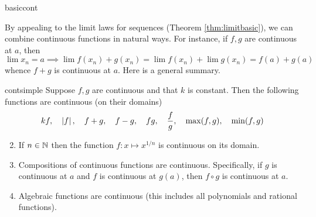 \begin{examples}{}{basiccont}
\begin{enumerate}
  
\end{enumerate}
\end{examples}


By appealing to the limit laws for sequences (Theorem \ref{thm:limitbasic}), we can combine continuous functions in natural ways. For instance, if $f,g$ are continuous at $a$, then
\[\lim x_n=a\implies \lim f(x_n)+g(x_n)=\lim f(x_n)+\lim g(x_n)=f(a)+g(a)\]
whence $f+g$ is continuous at $a$. Here is a general summary.

\begin{thm}{}{contsimple}
\exstart Suppose $f,g$ are continuous and that $k$ is constant. Then the following functions are continuous (on their domains)
	\[kf,\quad \left| f\right|,\quad f+g,\quad f-g,\quad fg,\quad \frac fg,\quad \max(f,g),\quad \min(f,g)\]
\begin{enumerate}\setcounter{enumi}{1}
	\item If $n\in\mathbb{N}$ then the function $f:x\mapsto x^{1/n}$ is continuous on its domain.
	\item Compositions of continuous functions are continuous. Specifically, if $g$ is continuous at $a$ and $f$ is continuous at $g(a)$, then $f\circ g$ is continuous at $a$.
	\item Algebraic functions are continuous (this includes all polynomials and rational functions).
\end{enumerate}
\end{thm}

